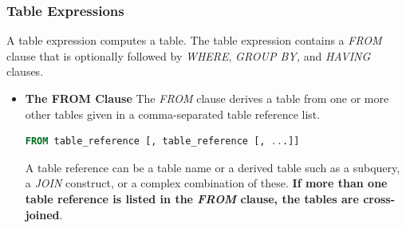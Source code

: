 \subsubsection{Table Expressions}
A table expression computes a table. The table expression contains a \textit{FROM} clause that is optionally followed by \textit{WHERE}, \textit{GROUP BY,} and \textit{HAVING} clauses. \vspace{.2cm}\\
\begin{addmargin}{-.5cm}
\begin{itemize}
\item \textbf{The FROM Clause}
The \textit{FROM} clause derives a table from one or more other tables given in a comma-separated table reference list.
\begin{lstlisting}[language=SQL]
FROM table_reference [, table_reference [, ...]]
\end{lstlisting}
A table reference can be a table name or a derived table such as a subquery, a \textit{JOIN} construct, or a complex combination of these. \textbf{If more than one table reference is listed in the \textit{FROM} clause, the tables are cross-joined}.


\end{itemize}
\end{addmargin}
